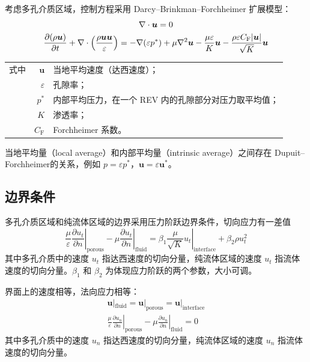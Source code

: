 
考虑多孔介质区域，控制方程采用 Darcy–Brinkman–Forchheimer 扩展模型：
\begin{gather}
	\nabla \cdot \bm{u} = 0 \\
	\frac{\partial(\rho\bm{u})}{\partial t} + 
	\nabla \cdot \left(\frac{\rho\bm{u}\bm{u}}{\varepsilon}\right) = 
	-\nabla (\varepsilon p^*) + \mu\nabla^2\bm{u} - 
	\frac{\mu\varepsilon}{K}\bm{u} - 
	\frac{\rho\varepsilon C_{\mathrm{F}}\lvert\bm{u}\vert}{\sqrt K}\bm{u}
\end{gather}
\begin{tabularx}{\textwidth}{@{}l@{\quad}r@{——}X@{}}
	式中 & $\bm{u}$ & 当地平均速度（达西速度）；\\
		& $\varepsilon$ & 孔隙率；\\
		& $p^*$ & 内部平均压力，在一个 REV 内的孔隙部分对压力取平均值；\\
		& $K$ & 渗透率；\\
		& $C_{\mathrm{F}}$ & Forchheimer 系数。
\end{tabularx}\vspace{3.15bp}
当地平均量（local average）和内部平均量（intrinsic average）之间存在 Dupuit–Forchheimer的关系，例如 $p=\varepsilon p^*$，$\bm{u}=\varepsilon \bm{u}^*$。

\subsection{边界条件} %

多孔介质区域和纯流体区域的边界采用压力阶跃边界条件，切向应力有一差值
\begin{equation}
	\left.\frac{\mu}{\varepsilon}\frac{\partial u_t}{\partial n}\right|_{\mathrm{porous}} -
	\left.\mu\frac{\partial u_t}{\partial n}\right|_{\mathrm{fluid}} =
	\left.\beta_1\frac{\mu}{\sqrt K}u_t\right|_{\mathrm{interface}} + \beta_2\rho u_t^2
\end{equation}
其中多孔介质中的速度 $u_t$ 指达西速度的切向分量，纯流体区域的速度 $u_t$ 指流体速度的切向分量。$\beta_1$ 和 $\beta_2$ 为体现应力阶跃的两个参数，大小可调。

界面上的速度相等，法向应力相等：
\begin{gather}
	\bm{u}|_{\mathrm{fluid}} = \bm{u}|_{\mathrm{porous}} = \bm{u}|_{\mathrm{interface}} \\
	\left.\frac{\mu}{\varepsilon}\frac{\partial u_n}{\partial n}\right|_{\mathrm{porous}} -
	\left.\mu\frac{\partial u_n}{\partial n}\right|_{\mathrm{fluid}} = 0
\end{gather}
其中多孔介质中的速度 $u_n$ 指达西速度的切向分量，纯流体区域的速度 $u_n$ 指流体速度的切向分量。

